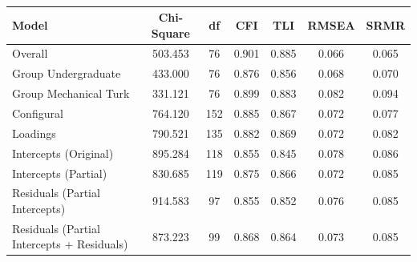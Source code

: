 \documentclass[
  english,
  man]{apa6}
\begin{document}
\begin{table}[tbp]

\begin{center}
\begin{threeparttable}

\caption{\label{tab:cfa-model-fit}}

\begin{tabular}{lcccccc}
\toprule
Model & Chi-Square & df & CFI & TLI & RMSEA & SRMR\\
\midrule
Overall & 503.453 & 76 & 0.901 & 0.885 & 0.066 & 0.065\\
Group Undergraduate & 433.000 & 76 & 0.876 & 0.856 & 0.068 & 0.070\\
Group Mechanical Turk & 331.121 & 76 & 0.899 & 0.883 & 0.082 & 0.094\\
Configural & 764.120 & 152 & 0.885 & 0.867 & 0.072 & 0.077\\
Loadings & 790.521 & 135 & 0.882 & 0.869 & 0.072 & 0.082\\
Intercepts (Original) & 895.284 & 118 & 0.855 & 0.845 & 0.078 & 0.086\\
Intercepts (Partial) & 830.685 & 119 & 0.875 & 0.866 & 0.072 & 0.085\\
Residuals (Partial Intercepts) & 914.583 & 97 & 0.855 & 0.852 & 0.076 & 0.085\\
Residuals (Partial Intercepts + Residuals) & 873.223 & 99 & 0.868 & 0.864 & 0.073 & 0.085\\
\bottomrule
\end{tabular}

\end{threeparttable}
\end{center}

\end{table}
\end{document}
